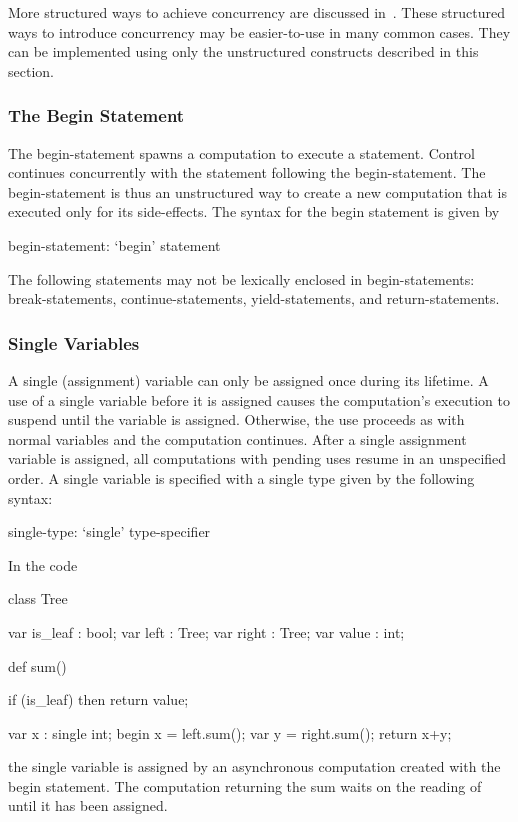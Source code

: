 More structured ways to achieve concurrency are discussed
in~.  These structured ways to
introduce concurrency may be easier-to-use in many common cases.  They
can be implemented using only the unstructured constructs described in
this section.

\subsubsection{The Begin Statement}
\label{Begin}

The begin-statement spawns a computation to execute a statement.
Control continues concurrently with the statement following the
begin-statement. The begin-statement is thus an unstructured way to
create a new computation that is executed only for its
side-effects. The syntax for the begin statement is given by
\begin{syntax}
begin-statement:
  `begin' statement
\end{syntax}

The following statements may not be lexically enclosed in
begin-statements: break-statements, continue-statements,
yield-statements, and return-statements.

\subsubsection{Single Variables}
\label{Single_Variables}

A single (assignment) variable can only be assigned once during its
lifetime.  A use of a single variable before it is assigned causes the
computation's execution to suspend until the variable is
assigned.  Otherwise, the use proceeds as with normal variables and the
computation continues.  After a single assignment variable is
assigned, all computations with pending uses resume in an unspecified
order.  A single variable is specified with a single type given by the
following syntax:
\begin{syntax}
single-type:
  `single' type-specifier
\end{syntax}

\begin{example}
In the code
\begin{chapel}
class Tree {
  var is_leaf : bool;
  var left    : Tree;
  var right   : Tree;
  var value   : int;

  def sum() {
    if (is_leaf) then 
       return value;

    var x : single int;
    begin x = left.sum();
    var y = right.sum();
    return x+y;
  }
}
\end{chapel}
the single variable  is assigned by an asynchronous
computation created with the begin statement.  The computation
returning the sum waits on the reading of  until it has been
assigned.
\end{example}


